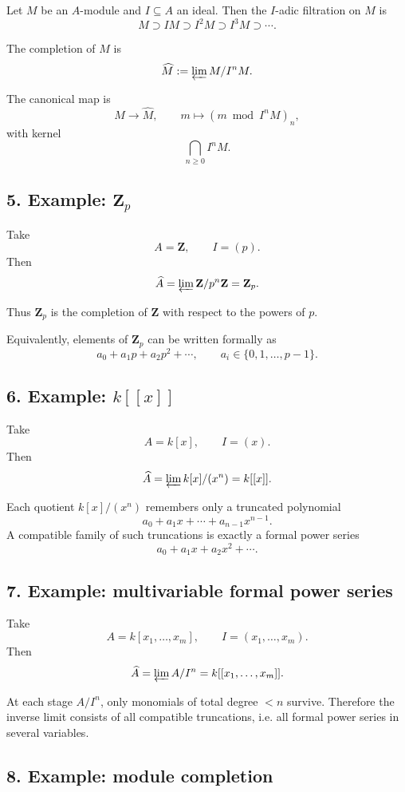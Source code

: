 \documentclass[12pt,a4paper]{article}
\theoremstyle{plain}
\theoremstyle{definition}      %
\begin{document}
	Let \(M\) be an \(A\)-module and \(I\subseteq A\) an ideal. Then the \(I\)-adic filtration on \(M\) is
	\[
	M \supset IM \supset I^2M \supset I^3M \supset \cdots.
	\]
	
	The completion of \(M\) is
	\[
	\widehat M := \varprojlim M/I^nM.
	\]
	
	The canonical map is
	\[
	M\to \widehat M,
	\qquad
	m\mapsto (m\bmod I^nM)_n,
	\]
	with kernel
	\[
	\bigcap_{n\ge0} I^nM.
	\]
	
	\subsection*{5. Example: \(\mathbf Z_p\)}
	
	Take
	\[
	A=\mathbf Z,\qquad I=(p).
	\]
	Then
	\[
	\widehat A=\varprojlim \mathbf Z/p^n\mathbf Z = \mathbf Z_p.
	\]
	
	Thus \(\mathbf Z_p\) is the completion of \(\mathbf Z\) with respect to the powers of \(p\).
	
	Equivalently, elements of \(\mathbf Z_p\) can be written formally as
	\[
	a_0+a_1p+a_2p^2+\cdots,
	\qquad a_i\in \{0,1,\dots,p-1\}.
	\]
	
	\subsection*{6. Example: \(k[[x]]\)}
	
	Take
	\[
	A=k[x],\qquad I=(x).
	\]
	Then
	\[
	\widehat A=\varprojlim k[x]/(x^n)=k[[x]].
	\]
	
	Each quotient \(k[x]/(x^n)\) remembers only a truncated polynomial
	\[
	a_0+a_1x+\cdots+a_{n-1}x^{n-1}.
	\]
	A compatible family of such truncations is exactly a formal power series
	\[
	a_0+a_1x+a_2x^2+\cdots.
	\]
	
	\subsection*{7. Example: multivariable formal power series}
	
	Take
	\[
	A=k[x_1,\dots,x_m],\qquad I=(x_1,\dots,x_m).
	\]
	Then
	\[
	\widehat A=\varprojlim A/I^n = k[[x_1,\dots,x_m]].
	\]
	
	At each stage \(A/I^n\), only monomials of total degree \(<n\) survive. Therefore the inverse limit consists of all compatible truncations, i.e. all formal power series in several variables.
	
	\subsection*{8. Example: module completion}
	
\end{document}
